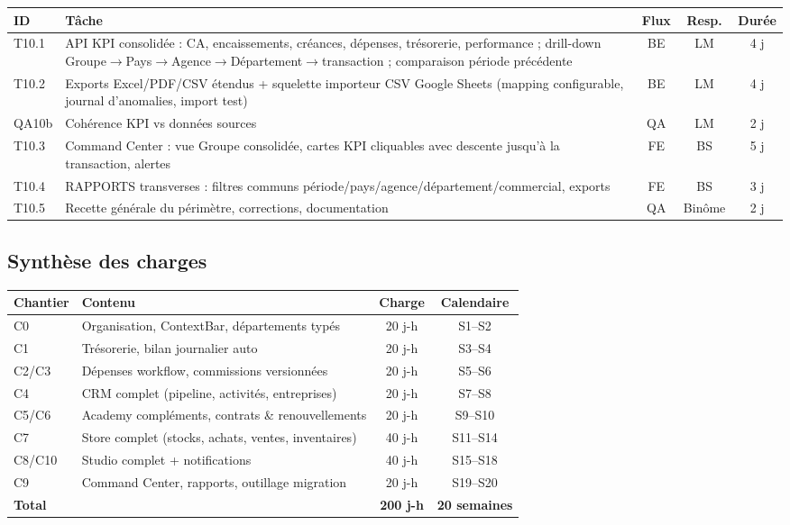 \documentclass[11pt,a4paper]{article}
\begin{document}
\begin{tabularx}{\textwidth}{|l|Y|c|c|c|}
\hline
{}\textbf{ID} & \textbf{Tâche} & \textbf{Flux} & \textbf{Resp.} & \textbf{Durée} \\ \hline
T10.1 & API KPI consolidée : CA, encaissements, créances, dépenses, trésorerie, performance ; drill-down Groupe$\rightarrow$Pays$\rightarrow$Agence$\rightarrow$Département$\rightarrow$transaction ; comparaison période précédente & BE & LM & 4 j \\ \hline
T10.2 & Exports Excel/PDF/CSV étendus + squelette importeur CSV Google Sheets (mapping configurable, journal d'anomalies, import test) & BE & LM & 4 j \\ \hline
QA10b & Cohérence KPI vs données sources & QA & LM & 2 j \\ \hline
T10.3 & Command Center : vue Groupe consolidée, cartes KPI cliquables avec descente jusqu'à la transaction, alertes & FE & BS & 5 j \\ \hline
T10.4 & RAPPORTS transverses : filtres communs période/pays/agence/département/commercial, exports & FE & BS & 3 j \\ \hline
T10.5 & Recette générale du périmètre, corrections, documentation & QA & Binôme & 2 j \\ \hline
\end{tabularx}

\subsection{Synthèse des charges}

\begin{tabularx}{\textwidth}{|l|Y|c|c|}
\hline
{}\textbf{Chantier} & \textbf{Contenu} & \textbf{Charge} & \textbf{Calendaire} \\ \hline
C0 & Organisation, ContextBar, départements typés & 20 j-h & S1--S2 \\ \hline
C1 & Trésorerie, bilan journalier auto & 20 j-h & S3--S4 \\ \hline
C2/C3 & Dépenses workflow, commissions versionnées & 20 j-h & S5--S6 \\ \hline
C4 & CRM complet (pipeline, activités, entreprises) & 20 j-h & S7--S8 \\ \hline
C5/C6 & Academy compléments, contrats \& renouvellements & 20 j-h & S9--S10 \\ \hline
C7 & Store complet (stocks, achats, ventes, inventaires) & 40 j-h & S11--S14 \\ \hline
C8/C10 & Studio complet + notifications & 40 j-h & S15--S18 \\ \hline
C9 & Command Center, rapports, outillage migration & 20 j-h & S19--S20 \\ \hline
{}\textbf{Total} & & \textbf{200 j-h} & \textbf{20 semaines} \\ \hline
\end{tabularx}
\end{document}
